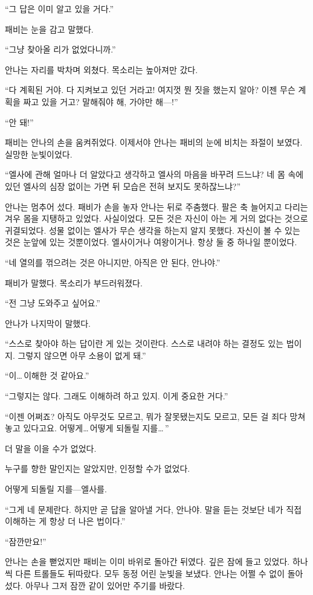 ``그 답은 이미 알고 있을 거다.''

패비는 눈을 감고 말했다.

``그냥 찾아올 리가 없었다니까.''

안나는 자리를 박차며 외쳤다. 목소리는 높아져만 갔다.

``다 계획된 거야. 다 지켜보고 있던 거라고! 여지껏 뭔 짓을 했는지 알아? 이젠 무슨 계획을 짜고 있을 거고? 말해줘야 해, 가야만 해—!''

``안 돼!''

패비는 안나의 손을 움켜쥐었다. 이제서야 안나는 패비의 눈에 비치는 좌절이 보였다. 실망한 눈빛이었다.

``엘사에 관해 얼마나 더 알았다고 생각하고 엘사의 마음을 바꾸려 드느냐? 네 몸 속에 있던 엘사의 심장 없이는 가면 뒤 모습은 전혀 보지도 못하잖느냐?''

안나는 멈추어 섰다. 패비가 손을 놓자 안나는 뒤로 주춤했다. 팔은 축 늘어지고 다리는 겨우 몸을 지탱하고 있었다. 사실이었다. 모든 것은 자신이 아는 게 거의 없다는 것으로 귀결되었다. 성물 없이는 엘사가 무슨 생각을 하는지 알지 못했다. 자신이 볼 수 있는 것은 눈앞에 있는 것뿐이었다. 엘사이거나 여왕이거나. 항상 둘 중 하나일 뿐이었다.

``네 열의를 꺾으려는 것은 아니지만, 아직은 안 된다, 안나야.''

패비가 말했다. 목소리가 부드러워졌다.

``전 그냥 도와주고 싶어요.''

안나가 나지막이 말했다.

``스스로 찾아야 하는 답이란 게 있는 것이란다. 스스로 내려야 하는 결정도 있는 법이지. 그렇지 않으면 아무 소용이 없게 돼.''

``이\ldots\,이해한 것 같아요.''

``그렇지는 않다. 그래도 이해하려 하고 있지. 이게 중요한 거다.''

``이젠 어쩌죠? 아직도 아무것도 모르고, 뭐가 잘못됐는지도 모르고, 모든 걸 죄다 망쳐놓고 있다고요. 어떻게\ldots\,어떻게 되돌릴 지를\ldots\,''

더 말을 이을 수가 없었다.

누구를 향한 말인지는 알았지만, 인정할 수가 없었다.

어떻게 되돌릴 지를—엘사를.

``그게 네 문제란다. 하지만 곧 답을 알아낼 거다, 안나야. 말을 듣는 것보단 네가 직접 이해하는 게 항상 더 나은 법이다.''

``잠깐만요!''

안나는 손을 뻗었지만 패비는 이미 바위로 돌아간 뒤였다. 깊은 잠에 들고 있었다. 하나씩 다른 트롤들도 뒤따랐다. 모두 동정 어린 눈빛을 보냈다. 안나는 어쩔 수 없이 돌아섰다. 아무나 그저 잠깐 같이 있어만 주기를 바랐다.

